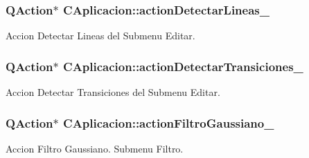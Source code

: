 \subsubsection[{\texorpdfstring{action\+Detectar\+Lineas\+\_\+}{actionDetectarLineas_}}]{\setlength{\rightskip}{0pt plus 5cm}Q\+Action$\ast$ C\+Aplicacion\+::action\+Detectar\+Lineas\+\_\+\hspace{0.3cm}{\ttfamily [private]}}\hypertarget{classCAplicacion_a5b6d0af534cc0f64dfb7598faa30f3ae}{}\label{classCAplicacion_a5b6d0af534cc0f64dfb7598faa30f3ae}


Accion Detectar Lineas del Submenu Editar. 

\subsubsection[{\texorpdfstring{action\+Detectar\+Transiciones\+\_\+}{actionDetectarTransiciones_}}]{\setlength{\rightskip}{0pt plus 5cm}Q\+Action$\ast$ C\+Aplicacion\+::action\+Detectar\+Transiciones\+\_\+\hspace{0.3cm}{\ttfamily [private]}}\hypertarget{classCAplicacion_acda82e41d91a94e32bbfa21965338f5a}{}\label{classCAplicacion_acda82e41d91a94e32bbfa21965338f5a}


Accion Detectar Transiciones del Submenu Editar. 

\subsubsection[{\texorpdfstring{action\+Filtro\+Gaussiano\+\_\+}{actionFiltroGaussiano_}}]{\setlength{\rightskip}{0pt plus 5cm}Q\+Action$\ast$ C\+Aplicacion\+::action\+Filtro\+Gaussiano\+\_\+\hspace{0.3cm}{\ttfamily [private]}}\hypertarget{classCAplicacion_ae6827414fe74e31b2216ec04f61ad21f}{}\label{classCAplicacion_ae6827414fe74e31b2216ec04f61ad21f}


Accion Filtro Gaussiano. Submenu Filtro. 

